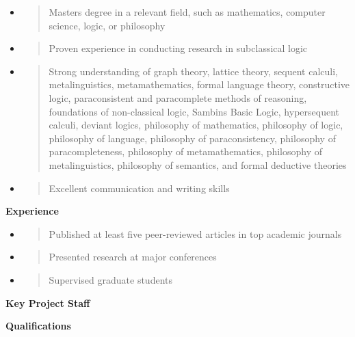 \begin{itemize}
\item
  \begin{quote}
  Master\textquotesingle s degree in a relevant field, such as
  mathematics, computer science, logic, or philosophy
  \end{quote}
\item
  \begin{quote}
  Proven experience in conducting research in subclassical logic
  \end{quote}
\item
  \begin{quote}
  Strong understanding of graph theory, lattice theory, sequent calculi,
  metalinguistics, metamathematics, formal language theory, constructive
  logic, paraconsistent and paracomplete methods of reasoning,
  foundations of non-classical logic, Sambin\textquotesingle s Basic
  Logic, hypersequent calculi, deviant logics, philosophy of
  mathematics, philosophy of logic, philosophy of language, philosophy
  of paraconsistency, philosophy of paracompleteness, philosophy of
  metamathematics, philosophy of metalinguistics, philosophy of
  semantics, and formal deductive theories
  \end{quote}
\item
  \begin{quote}
  Excellent communication and writing skills
  \end{quote}
\end{itemize}

\textbf{Experience}

\begin{itemize}
\item
  \begin{quote}
  Published at least five peer-reviewed articles in top academic
  journals
  \end{quote}
\item
  \begin{quote}
  Presented research at major conferences
  \end{quote}
\item
  \begin{quote}
  Supervised graduate students
  \end{quote}
\end{itemize}

\textbf{Key Project Staff}

\textbf{Qualifications}

